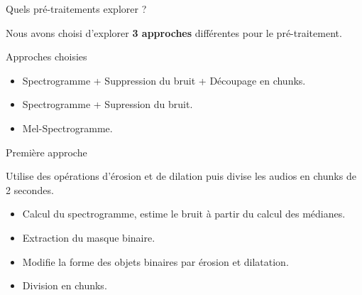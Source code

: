 \documentclass[compress,xcolor=table]{beamer}
\begin{document}
\begin{frame}{Quels pré-traitements explorer ?}

    Nous avons choisi d'explorer \textbf{3 approches} différentes pour le pré-traitement.

    \begin{block}{Approches choisies}
        \begin{itemize}
            \item Spectrogramme + Suppression du bruit + Découpage en chunks.
            \item Spectrogramme + Supression du bruit.
            \item Mel-Spectrogramme.
        \end{itemize}
    \end{block}

\end{frame}

\begin{frame}{Première approche}

    \begin{block}{ \cite{sprengelAudioBasedBird2016}}
        Utilise des opérations d'érosion et de dilation puis divise les audios en chunks de 2 secondes.
        \begin{itemize}
            \item Calcul du spectrogramme, estime le bruit à partir du calcul des médianes.
            \item Extraction du masque binaire.
            \item Modifie la forme des objets binaires par érosion et dilatation.
            \item Division en chunks.
        \end{itemize}
    \end{block}

\end{frame}
\end{document}
